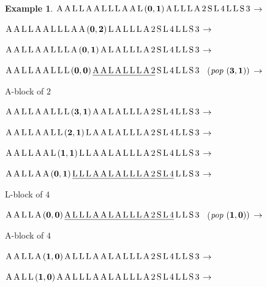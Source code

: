 \documentclass{article}
\theoremstyle{plain}
\theoremstyle{definition}
\newtheorem{Exa}[The]{Example}
\begin{document}
{\begin{Exa}
 ${\rm A \, A \, L \, L \, A \, A \, L \, L \, L \, A \, A \, L \, {\bf (0,1)} \, A \, L \, L \,  L \, A \, 2 \, S \, L \, 4 \, L \, L \, S \, 3}$ $\rightarrow$

 ${\rm A \, A \, L \, L \, A \, A \, L \, L \, L \, A \, A \, {\bf (0,2)} \, L \, A \, L \, L \,  L \, A \, 2 \, S \, L \, 4 \, L \, L \, S \, 3}$ $\rightarrow$

 ${\rm A \, A \, L \, L \, A \, A \, L \, L \, L \, A \, {\bf (0,1)} \, A \, L \, A \, L \, L \,  L \, A \, 2 \, S \, L \, 4 \, L \, L \, S \, 3}$ $\rightarrow$

 ${\rm A \, A \, L \, L \, A \, A \, L \, L \, L \, {\bf (0,0)} \, \underline{\rule[-0.1em]{0em}{1em} A \, A \, L \, A \, L \, L \,  L \, A \, 2} \, S \, L \, 4 \, L \, L \, S \, 3}$ ~(${\it pop~} {\bf (3,1)})$ $\rightarrow$

 \hspace{3.7cm} {\rm A}-block of $2$

 ${\rm A \, A \, L \, L \, A \, A \, L \, L \, L \, {\bf (3,1)} \, A \, A \, L \, A \, L \, L \,  L \, A \, 2 \, S \, L \, 4 \, L \, L \, S \, 3}$ $\rightarrow$

 ${\rm A \, A \, L \, L \, A \, A \, L \, L \, {\bf (2,1)} \, L \, A \, A \, L \, A \, L \, L \,  L \, A \, 2 \, S \, L \, 4 \, L \, L \, S \, 3}$ $\rightarrow$

 ${\rm A \, A \, L \, L \, A \, A \, L \, {\bf (1,1)} \, L \, L \, A \, A \, L \, A \, L \, L \,  L \, A \, 2 \, S \, L \, 4 \, L \, L \, S \, 3}$ $\rightarrow$


 ${\rm A \, A \, L \, L \, A \, A \, {\bf (0,1)} \, \underline{\rule[-0.1em]{0em}{1em} L \, L \, L \, A \, A \, L \, A \, L \, L \,  L \, A \, 2 \, S \, L \, 4} \, L \, L \, S \, 3}$ $\rightarrow$

 \hspace{3.7cm} {\rm L}-block of $4$

 ${\rm A \, A \, L \, L \, A \, {\bf (0,0)} \, \underline{\rule[-0.1em]{0em}{1em} A \, L \, L \, L \, A \, A \, L \, A \, L \, L \,  L \, A \, 2 \, S \, L \, 4} \, L \, L \, S \, 3}$ ~(${\it pop~} {\bf (1,0)})$ $\rightarrow$

 \hspace{3.6cm} {\rm A}-block of $4$

 ${\rm A \, A \, L \, L \, A \, {\bf (1,0)} \, A \, L \, L \, L \, A \, A \, L \, A \, L \, L \,  L \, A \, 2 \, S \, L \, 4 \, L \, L \, S \, 3}$ $\rightarrow$

 ${\rm A \, A \, L \, L \, {\bf (1,0)} \, A \, A \, L \, L \, L \, A \, A \, L \, A \, L \, L \,  L \, A \, 2 \, S \, L \, 4 \, L \, L \, S \, 3}$ $\rightarrow$


\end{Exa}}
\end{document}
